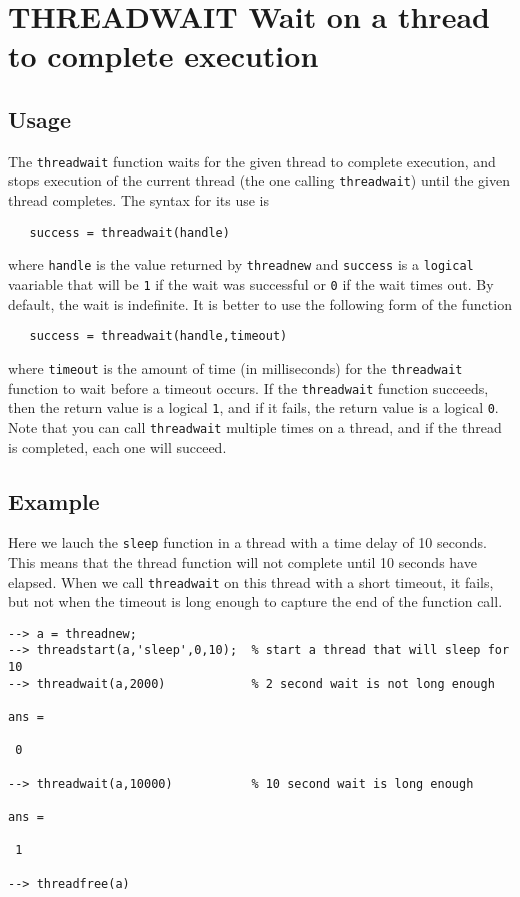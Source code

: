 \section{THREADWAIT Wait on a thread to complete execution}

\subsection{Usage}

The \verb|threadwait| function waits for the given thread to complete
execution, and stops execution of the current thread (the one calling
\verb|threadwait|) until the given thread completes.  The syntax for its
use is 
\begin{verbatim}
   success = threadwait(handle)
\end{verbatim}
where \verb|handle| is the value returned by \verb|threadnew| and \verb|success|
is a \verb|logical| vaariable that will be \verb|1| if the wait was successful
or \verb|0| if the wait times out.  By default, the wait is indefinite.  It
is better to use the following form of the function
\begin{verbatim}
   success = threadwait(handle,timeout)
\end{verbatim}
where \verb|timeout| is the amount of time (in milliseconds) for 
the \verb|threadwait| function to wait before a timeout occurs.  
If the \verb|threadwait| function succeeds, then the return 
value is a logical \verb|1|, and if it fails, the return value 
is a logical \verb|0|.  Note that you can call \verb|threadwait| multiple
times on a thread, and if the thread is completed, each one
will succeed.
\subsection{Example}

Here we lauch the \verb|sleep| function in a thread with a time delay of 
10 seconds.  This means that the thread function will not complete
until 10 seconds have elapsed.  When we call \verb|threadwait| on this
thread with a short timeout, it fails, but not when the timeout
is long enough to capture the end of the function call.
\begin{verbatim}
--> a = threadnew;
--> threadstart(a,'sleep',0,10);  % start a thread that will sleep for 10
--> threadwait(a,2000)            % 2 second wait is not long enough

ans = 

 0 

--> threadwait(a,10000)           % 10 second wait is long enough

ans = 

 1 

--> threadfree(a)
\end{verbatim}

